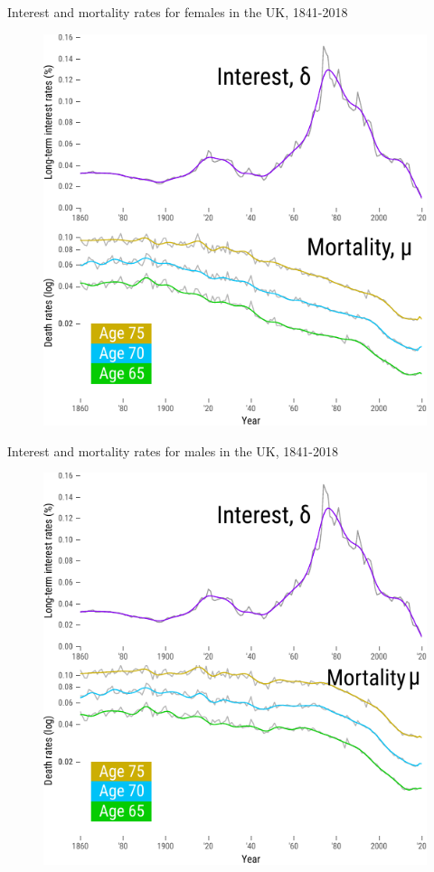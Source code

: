 \documentclass[10pt]{beamer}
\begin{document}
\begin{frame}{Interest and mortality rates for females in the UK, 1841-2018}
\begin{figure}
	\centering
	\hspace*{-0.8cm}
	\includegraphics[scale=0.9] {Fig0.pdf}
\end{figure}
\end{frame}


\begin{frame}{Interest and mortality rates for males in the UK, 1841-2018}
\begin{figure}
	\centering
	\hspace*{-0.8cm}
	\includegraphics[scale=0.9] {Fig0m.pdf}
\end{figure}
\end{frame}
\end{document}
